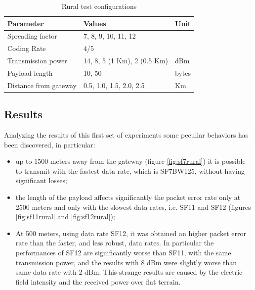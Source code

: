 \begin{table}[]
\centering
\caption{Rural test configurations}
\label{tab:ruraltest}
\begin{tabular}{@{}lll@{}}
\toprule
Parameter           & Values & Unit  \\ \midrule
Spreading factor    & 7, 8, 9, 10, 11, 12  &       \\
Coding Rate    & 4/5  &       \\
Transmission power  & 14, 8, 5 (1 Km), 2 (0.5 Km)  & dBm   \\
Payload length      & 10, 50 & bytes \\
Distance from gateway & 0.5, 1.0, 1.5, 2.0, 2.5 & Km    \\ \bottomrule
\end{tabular}
\end{table}

\subsection{Results}
Analyzing the results of this first set of experiments some peculiar behaviors has been discovered, in particular:
\begin{itemize}
\item up to 1500 meters away from the gateway (figure \ref{fig:sf7rural}) it is possible to transmit with the fastest data rate, which is SF7BW125, without having significant losses;

\item the length of the payload affects significantly the packet error rate only at 2500 meters and only with the slowest data rates, i.e. SF11 and SF12 (figures \ref{fig:sf11rural} and \ref{fig:sf12rural}); 

\item At 500 meters, using data rate SF12, it was obtained an higher packet error rate than the faster, and less robust, data rates. In particular the performances of SF12 are significantly worse than SF11, with the same transmission power, and the results with 8 dBm were slightly worse than same data rate with 2 dBm. This strange results are caused by the electric field intensity and the received power over flat terrain.
\end{itemize}


